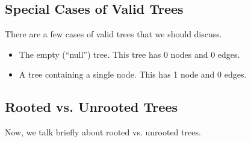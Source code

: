 \documentclass[letterpaper]{article}
\begin{document}
\subsection{Special Cases of Valid Trees}
There are a few cases of valid trees that we should discuss. 

\begin{itemize}
    \item The empty (``null'') tree. This tree has 0 nodes and 0 edges. 
    \item A tree containing a single node. This has 1 node and 0 edges. 
\end{itemize}

\subsection{Rooted vs. Unrooted Trees}
Now, we talk briefly about rooted vs. unrooted trees. 
\end{document}
